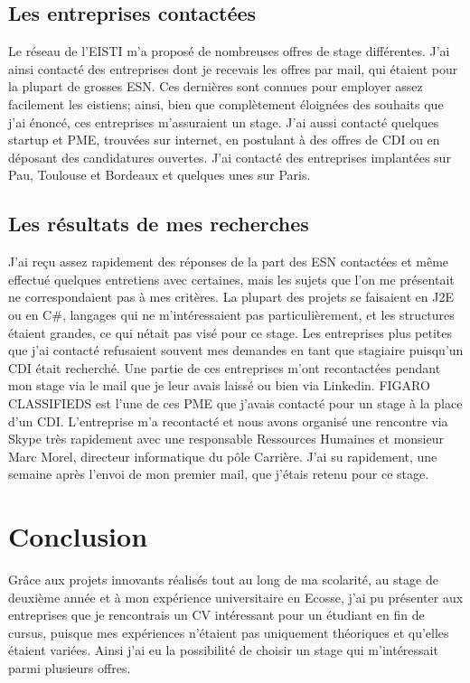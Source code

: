 \subsection{Les entreprises contactées}
Le réseau de l'EISTI m'a proposé de nombreuses offres de stage différentes.
J'ai ainsi contacté des entreprises dont je recevais les offres par mail, qui étaient pour la plupart de grosses ESN.
Ces dernières sont connues pour employer assez facilement les eistiens; ainsi, bien que complètement éloignées des souhaits que j'ai énoncé, ces entreprises m'assuraient un stage.
J'ai aussi contacté quelques startup et PME, trouvées sur internet, en postulant à des offres de CDI ou en déposant des candidatures ouvertes.
J'ai contacté des entreprises implantées sur Pau, Toulouse et Bordeaux et quelques unes sur Paris.

\subsection{Les résultats de mes recherches}
J'ai reçu assez rapidement des réponses de la part des ESN contactées et même effectué quelques entretiens avec certaines, mais les sujets que l'on me présentait ne correspondaient pas à mes critères.
La plupart des projets se faisaient en J2E ou en C\#, langages qui ne m'intéressaient pas particulièrement, et les structures étaient grandes, ce qui nétait pas visé pour ce stage.
Les entreprises plus petites que j'ai contacté refusaient souvent mes demandes en tant que stagiaire puisqu'un CDI était recherché.
Une partie de ces entreprises m'ont recontactées pendant mon stage via le mail que je leur avais laissé ou bien via Linkedin.
FIGARO CLASSIFIEDS est l'une de ces PME que j'avais contacté pour un stage à la place d'un CDI.
L'entreprise m'a recontacté et nous avons organisé une rencontre via Skype très rapidement avec une responsable Ressources Humaines et monsieur Marc Morel, directeur informatique du pôle Carrière.
J'ai su rapidement, une semaine après l'envoi de mon premier mail, que j'étais retenu pour ce stage.


\section{Conclusion}

Grâce aux projets innovants réalisés tout au long de ma scolarité, au stage de deuxième année et à mon expérience universitaire en Ecosse, j'ai pu présenter aux entreprises que je rencontrais un CV intéressant pour un étudiant en fin de cursus, puisque mes expériences n'étaient pas uniquement théoriques et qu'elles étaient variées.
Ainsi j'ai eu la possibilité de choisir un stage qui m'intéressait parmi plusieurs offres.
